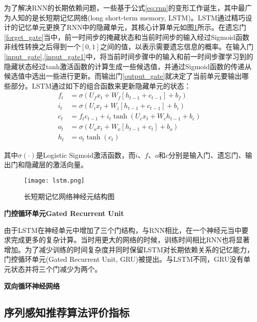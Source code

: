 为了解决RNN的长期依赖问题，一些基于公式\ref{eq:rnn}的变形工作诞生，其中最广为人知的是长短期记忆网络(long short-term memory, LSTM)。LSTM通过精巧设计的记忆单元更换了RNN中的隐藏单元，其核心计算单元如图\ref{fig:lstm}所示。在遗忘门\eqref{forget_gate}当中，前一时间步的掩藏状态和当前时间步的输入经过Sigmoid函数非线性转换之后得到一个$[0,1]$之间的值，以表示需要遗忘信息的概率。在输入门\eqref{input_gate},\eqref{input_gate1}中，将当前时间步骤中的输入和前一时间步骤学习到的隐藏状态经过tanh激活函数的计算生成一些候选值，并通过Sigmoid函数的传递从候选值中选出一些进行更新。而输出门\eqref{output_gate}就决定了当前单元要输出哪些部分。LSTM通过如下的组合函数来更新隐藏单元的状态：
  \begin{align} 
  f_{t} &=\sigma(U_{f} x_{t}+W_{f}[h_{t-1}+ c_{t-1}] +b_{f}) \label{forget_gate}\\
  i_{t} &=\sigma(U_{i} x_{t}+W_{i}[h_{t-1}+ c_{t-1}]+b_{i}) \label{input_gate}\\  
  c_{t} &=f_{t} c_{t-1}+i_{t} \tanh (U_{c} x_{t}+W_{c} h_{t-1}+b_{c}) \label{input_gate1}\\ 
  o_{t} &=\sigma(U_{o} x_{t}+W_{o}[h_{t-1}+ c_{t}]+b_{o}) \label{output_gate}\\ 
  h_{t} &=o_{t} \tanh (c_{t}) 
  \end{align}

其中$\sigma(\cdot)$是Logistic Sigmoid激活函数，而$i$、$f$、$o$和$c$分别是输入门、遗忘门、输出门和隐藏层的激活向量。

\begin{figure}[htb]
  \centering
  \texttt{[image: lstm.png]}\\
  \caption{长短期记忆网络神经元结构图}
  \label{fig:lstm}
\end{figure}

\textbf{门控循环单元Gated Recurrent Unit}

由于LSTM在神经单元中增加了三个门结构，与RNN相比，在一个神经元当中要求完成更多的复杂计算。当时用更大的网络的时候，训练时间相比RNN也将显著增加。为了减少训练的时间复杂度并同时保留LSTM对长期依赖关系的记忆能力，门控循环单元(Gated Recurrent Unit, GRU)被提出。与LSTM不同，GRU没有单元状态并将三个门减少为两个。

\textbf{双向循环神经网络}






\subsection{序列感知推荐算法评价指标}



